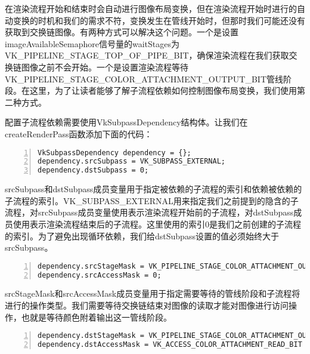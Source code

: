 \documentclass{ctexart}
\begin{document}
在渲染流程开始和结束时会自动进行图像布局变换，但在渲染流程开始时进行的自动变换的时机和我们的需求不符，变换发生在管线开始时，但那时我们可能还没有获取到交换链图像。有两种方式可以解决这个问题。一个是设置imageAvailableSemaphore信号量的waitStages为VK\_PIPELINE\_STAGE\_TOP\_OF\_PIPE\_BIT，确保渲染流程在我们获取交换链图像之前不会开始。一个是设置渲染流程等待VK\_PIPELINE\_STAGE\_COLOR\_ATTACHMENT\_OUTPUT\_BIT管线阶段。在这里，为了让读者能够了解子流程依赖如何控制图像布局变换，我们使用第二种方式。

配置子流程依赖需要使用VkSubpassDependency结构体。让我们在createRenderPass函数添加下面的代码：

\begin{lstlisting}[language={[ANSI]C},keywordstyle=\color{blue!70},commentstyle=\color{red!50!green!50!blue!50},frame=shadowbox, rulesepcolor=\color{red!20!green!20!blue!20},basicstyle=\small,numbers=left, numberstyle=\tiny,breaklines=true]
VkSubpassDependency dependency = {};
dependency.srcSubpass = VK_SUBPASS_EXTERNAL;
dependency.dstSubpass = 0;
\end{lstlisting}

srcSubpass和dstSubpass成员变量用于指定被依赖的子流程的索引和依赖被依赖的子流程的索引。VK\_SUBPASS\_EXTERNAL用来指定我们之前提到的隐含的子流程，对srcSubpass成员变量使用表示渲染流程开始前的子流程，对dstSubpass成员使用表示渲染流程结束后的子流程。这里使用的索引0是我们之前创建的子流程的索引。为了避免出现循环依赖，我们给dstSubpass设置的值必须始终大于srcSubpass。

\begin{lstlisting}[language={[ANSI]C},keywordstyle=\color{blue!70},commentstyle=\color{red!50!green!50!blue!50},frame=shadowbox, rulesepcolor=\color{red!20!green!20!blue!20},basicstyle=\small,numbers=left, numberstyle=\tiny,breaklines=true]
dependency.srcStageMask = VK_PIPELINE_STAGE_COLOR_ATTACHMENT_OUTPUT_BIT;
dependency.srcAccessMask = 0;
\end{lstlisting}

srcStageMask和srcAccessMask成员变量用于指定需要等待的管线阶段和子流程将进行的操作类型。我们需要等待交换链结束对图像的读取才能对图像进行访问操作，也就是等待颜色附着输出这一管线阶段。

\begin{lstlisting}[language={[ANSI]C},keywordstyle=\color{blue!70},commentstyle=\color{red!50!green!50!blue!50},frame=shadowbox, rulesepcolor=\color{red!20!green!20!blue!20},basicstyle=\small,numbers=left, numberstyle=\tiny,breaklines=true]
dependency.dstStageMask = VK_PIPELINE_STAGE_COLOR_ATTACHMENT_OUTPUT_BIT;
dependency.dstAccessMask = VK_ACCESS_COLOR_ATTACHMENT_READ_BIT | VK_ACCESS_COLOR_ATTACHMENT_WRITE_BIT;
\end{lstlisting}
\end{document}
